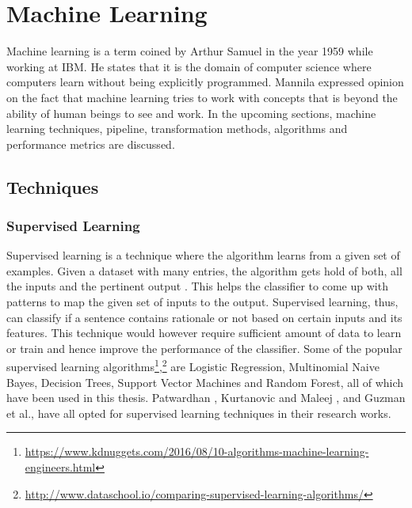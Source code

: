 \documentclass[a4paper,12pt,twoside]{report}
\begin{document}

\section{Machine Learning}
Machine learning is a term coined by Arthur Samuel in the year 1959 \cite{Samuel1959a} while working at IBM. He states that it is the domain of computer science where computers learn without being explicitly programmed. Mannila \cite{Mannila1996a} expressed opinion on the fact that machine learning tries to work with concepts that is beyond the ability of human beings to see and work. In the upcoming sections, machine learning techniques, pipeline, transformation methods, algorithms and performance metrics are discussed. 

\subsection{Techniques}

\subsubsection{Supervised Learning}
Supervised learning is a technique where the algorithm learns from a given set of examples. Given a dataset with many entries, the algorithm gets hold of both, all the inputs and the pertinent output \cite{Singh2016}\cite{Caruana2006}. This helps the classifier to come up with patterns to map the given set of inputs to the output. Supervised learning, thus, can classify if a sentence contains rationale or not based on certain inputs and its features. This technique would however require sufficient amount of data to learn or train and hence improve the performance of the classifier. Some of the popular supervised learning algorithms\footnote{\url{https://www.kdnuggets.com/2016/08/10-algorithms-machine-learning-engineers.html}},\footnote{\url{http://www.dataschool.io/comparing-supervised-learning-algorithms/}} are Logistic Regression, Multinomial Naive Bayes, Decision Trees, Support Vector Machines and Random Forest, all of which have been used in this thesis. Patwardhan \cite{Patwardhan2017}, Kurtanovic and Maleej \cite{Kurtanovic2017}, and Guzman et al.\cite{Guzman2016}, have all opted for supervised learning techniques in their research works.
\end{document}

